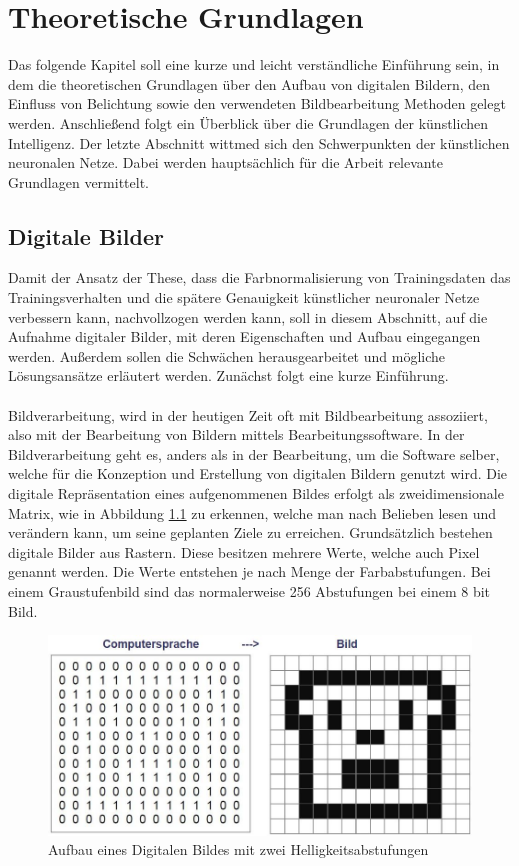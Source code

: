 \chapter{Theoretische Grundlagen}\label{s.grundlagen}
Das folgende Kapitel soll eine kurze und leicht verständliche Einführung sein, in dem die theoretischen Grundlagen über den Aufbau von digitalen Bildern, den Einfluss von Belichtung sowie den verwendeten Bildbearbeitung Methoden gelegt werden. Anschließend folgt ein Überblick über die Grundlagen der künstlichen Intelligenz. Der letzte Abschnitt wittmed sich den Schwerpunkten der künstlichen neuronalen Netze. Dabei werden hauptsächlich für die Arbeit relevante Grundlagen vermittelt. 
\section{Digitale Bilder}\label{s.digibilder}
Damit der Ansatz der These, dass die Farbnormalisierung von Trainingsdaten das Trainingsverhalten und die spätere Genauigkeit künstlicher neuronaler Netze verbessern kann, nachvollzogen werden kann, soll in diesem Abschnitt, auf die Aufnahme digitaler Bilder, mit deren Eigenschaften und Aufbau eingegangen werden. Außerdem sollen die Schwächen herausgearbeitet und mögliche Lösungsansätze erläutert werden. Zunächst folgt eine kurze Einführung.\\\\
Bildverarbeitung, wird in der heutigen Zeit oft mit Bildbearbeitung assoziiert, also mit der Bearbeitung von Bildern mittels Bearbeitungssoftware. In der Bildverarbeitung geht es, anders als in der Bearbeitung, um die Software selber, welche für die Konzeption und Erstellung von digitalen Bildern genutzt wird. Die digitale Repräsentation eines aufgenommenen Bildes erfolgt als zweidimensionale Matrix, wie in Abbildung \ref{img:digitalesbild} zu erkennen, welche man nach Belieben lesen und verändern kann, um seine geplanten Ziele zu erreichen. Grundsätzlich bestehen digitale Bilder aus Rastern. Diese besitzen mehrere Werte, welche auch Pixel genannt werden. Die Werte entstehen je nach Menge der Farbabstufungen. Bei einem Graustufenbild sind das normalerweise 256 Abstufungen bei einem 8 bit Bild. 
\begin{figure}
[h]
\centering
\includegraphics[scale=0.5]{Sources/Digitalesbild.JPG}
\caption{Aufbau eines Digitalen Bildes mit zwei Helligkeitsabstufungen}
\label{img:digitalesbild}
\end{figure}\\
